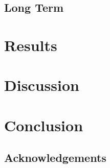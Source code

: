 \documentclass{ituthesis}
\begin{document}
	\section{Long Term}
	\label{sec:evaluation_long}

\chapter{Results}
\label{ch:results}

\chapter{Discussion}
\label{ch:discussion}

\chapter{Conclusion}
\label{ch:conclusion}

	\section{Acknowledgements}
	\label{sec:acknowledgements}

\clearpage


\end{document}
